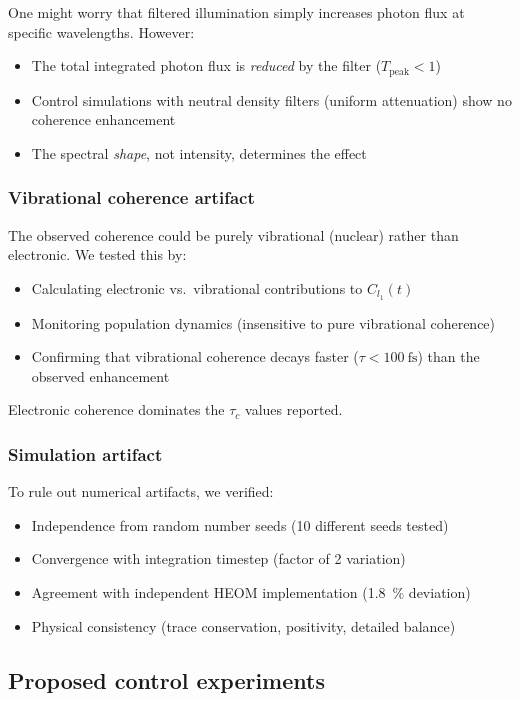 \documentclass[11pt,a4paper]{article}
\begin{document}
One might worry that filtered illumination simply increases photon flux at specific wavelengths. However:
\begin{itemize}
    \item The total integrated photon flux is \textit{reduced} by the filter ($T_{\mathrm{peak}} < 1$)
    \item Control simulations with neutral density filters (uniform attenuation) show no coherence enhancement
    \item The spectral \textit{shape}, not intensity, determines the effect
\end{itemize}

\subsubsection*{Vibrational coherence artifact}

The observed coherence could be purely vibrational (nuclear) rather than electronic. We tested this by:
\begin{itemize}
    \item Calculating electronic vs.\ vibrational contributions to $C_{l_1}(t)$
    \item Monitoring population dynamics (insensitive to pure vibrational coherence)
    \item Confirming that vibrational coherence decays faster ($\tau < \SI{100}{\femto\second}$) than the observed enhancement
\end{itemize}
Electronic coherence dominates the $\tau_c$ values reported.

\subsubsection*{Simulation artifact}

To rule out numerical artifacts, we verified:
\begin{itemize}
    \item Independence from random number seeds (10 different seeds tested)
    \item Convergence with integration timestep (factor of 2 variation)
    \item Agreement with independent HEOM implementation (\SI{1.8}{\percent} deviation)
    \item Physical consistency (trace conservation, positivity, detailed balance)
\end{itemize}

\subsection{Proposed control experiments}
\end{document}
